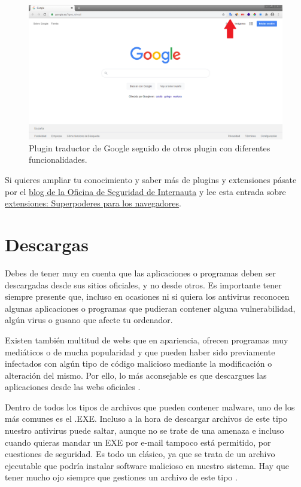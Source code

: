 \documentclass[
  a4paper,
  openany]{book}
\begin{document}
\begin{figure}

{\centering \includegraphics[width=0.75\linewidth]{images/plugin-navegador} 

}

\caption{Plugin traductor de Google seguido de otros plugin con diferentes funcionalidades.}\label{fig:unnamed-chunk-12}
\end{figure}

Si quieres ampliar tu conocimiento y saber más de plugins y extensiones pásate por el \href{https://www.osi.es/es/actualidad/blog}{blog de la Oficina de Seguridad de Internauta} y lee esta entrada sobre \href{https://www.osi.es/es/actualidad/blog/2019/11/20/extensiones-superpoderes-para-los-navegadores}{extensiones: Superpoderes para los navegadores}.

\hypertarget{descargas}{%
\section{Descargas}\label{descargas}}

Debes de tener muy en cuenta que las aplicaciones o programas deben ser descargadas desde sus sitios oficiales, y no desde otros. Es importante tener siempre presente que, incluso en ocasiones ni si quiera los antivirus reconocen algunas aplicaciones o programas que pudieran contener alguna vulnerabilidad, algún virus o gusano que afecte tu ordenador.

Existen también multitud de webs que en apariencia, ofrecen programas muy mediáticos o de mucha popularidad y que pueden haber sido previamente infectados con algún tipo de código malicioso mediante la modificación o alteración del mismo. Por ello, lo más aconsejable es que descargues las aplicaciones desde las webs oficiales \citep{software-alterado}.

Dentro de todos los tipos de archivos que pueden contener malware, uno de los más comunes es el .EXE. Incluso a la hora de descargar archivos de este tipo nuestro antivirus puede saltar, aunque no se trate de una amenaza e incluso cuando quieras mandar un EXE por e-mail tampoco está permitido, por cuestiones de seguridad. Es todo un clásico, ya que se trata de un archivo ejecutable que podría instalar software malicioso en nuestro sistema. Hay que tener mucho ojo siempre que gestiones un archivo de este tipo \citep{RZ-exe}.
\end{document}
